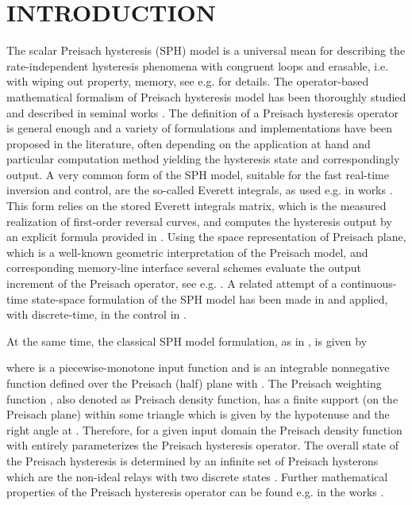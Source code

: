 \documentclass[journal]{IEEEtran}
\begin{document}
\IEEEpeerreviewmaketitle






\section{INTRODUCTION}
\label{sec:1}

The scalar Preisach hysteresis (SPH) model is a universal mean for
describing the rate-independent hysteresis phenomena with
congruent loops and erasable, i.e. with wiping out property,
memory, see e.g. \cite{Maye03} for details. The operator-based
mathematical formalism of Preisach hysteresis model has been
thoroughly studied and described in seminal works
\cite{Maye03,Krejci96,Visit94,BrokSprek96}. The definition of a
Preisach hysteresis operator is general enough and a variety of
formulations and implementations have been proposed in the
literature, often depending on the application at hand and
particular computation method yielding the hysteresis state and
correspondingly output. A very common form of the SPH model,
suitable for the fast real-time inversion and control, are the
so-called Everett integrals, as used e.g. in works
\cite{davino2005,davino2008,davino2014}. This form relies on the
stored Everett integrals matrix, which is the measured realization
of first-order reversal curves, and computes the hysteresis output
by an explicit formula provided in \cite{doong1985,mayergoyz1988}.
Using the space representation of Preisach plane, which is a
well-known geometric interpretation of the Preisach model, and
corresponding memory-line interface several schemes evaluate the
output increment of the Preisach operator, see e.g.
\cite{mccarthy2011}. A related attempt of a continuous-time
state-space formulation of the SPH model has been made in
\cite{RudBert11} and applied, with discrete-time, in the control
in \cite{ruderman2014}.

At the same time, the classical SPH model formulation, as in
\cite{Maye86}, is given by

where  is a piecewise-monotone input function and  is an integrable nonnegative function defined
over the  Preisach (half) plane with . The Preisach weighting function , also denoted
as Preisach density function, has a finite support (on the
Preisach plane) within some triangle  which is given by the
hypotenuse  and the right angle at . Therefore, for a given input domain  the Preisach density function 
with  entirely parameterizes the Preisach
hysteresis operator. The overall state of the Preisach hysteresis
is determined by an infinite set of Preisach hysterons
 which are the non-ideal relays with
two discrete states .
Further mathematical properties of the Preisach hysteresis
operator can be found e.g. in the works \cite{Maye86,brokate1989}.
\end{document}
